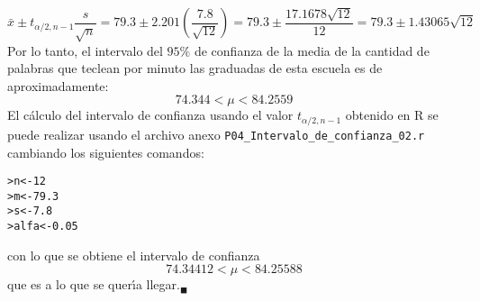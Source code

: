\begin{solucion}
 \begin{equation*}
  \bar{x} \pm t_{\alpha/2,n-1}\frac{s}{\sqrt{n}} = 79.3 \pm 2.201\left( \frac{7.8}{\sqrt{12}} \right) = 79.3 \pm \frac{17.1678\sqrt{12}}{12} = 79.3 \pm 1.43065\sqrt{12}
 \end{equation*}
 Por lo tanto, el intervalo del $95\%$ de confianza de la media de la cantidad de palabras que teclean por minuto las graduadas de esta escuela es de aproximadamente:
 \begin{equation*}
  74.344 < \mu < 84.2559
 \end{equation*}
 El c\'alculo del intervalo de confianza usando el valor $t_{\alpha/2,n-1}$ obtenido en R se puede realizar usando el archivo anexo \texttt{P04\_Intervalo\_de\_confianza\_02.r} cambiando los siguientes comandos:
 \begin{verbatim}
>n<-12
>m<-79.3
>s<-7.8
>alfa<-0.05
 \end{verbatim}
 \vspace{-0.5cm}
 con lo que se obtiene el intervalo de confianza
 \begin{equation*}
  74.34412 < \mu < 84.25588
 \end{equation*}
 que es a lo que se quer\'{\i}a llegar.${}_{\blacksquare}$
\end{solucion}
